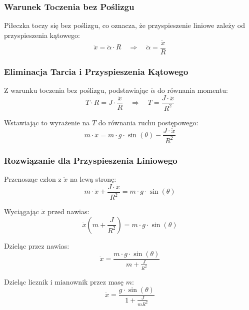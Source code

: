 \subsubsection{Warunek Toczenia bez Poślizgu}

Piłeczka toczy się bez poślizgu, co oznacza, że przyspieszenie liniowe zależy od 
przyspieszenia kątowego:
\begin{equation}
\ddot{x} = \ddot{\alpha} \cdot R \quad \Rightarrow \quad \ddot{\alpha} = \frac{\ddot{x}}{R}
\end{equation}

\subsubsection{Eliminacja Tarcia i Przyspieszenia Kątowego}

Z warunku toczenia bez poślizgu, podstawiając $\ddot{\alpha}$ do równania momentu:
\begin{equation}
T \cdot R = J \cdot \frac{\ddot{x}}{R} \quad \Rightarrow \quad T = \frac{J \cdot \ddot{x}}{R^2}
\end{equation}

Wstawiając to wyrażenie na $T$ do równania ruchu postępowego:
\begin{equation}
m \cdot \ddot{x} = m \cdot g \cdot \sin(\theta) - \frac{J \cdot \ddot{x}}{R^2}
\end{equation}

\subsubsection{Rozwiązanie dla Przyspieszenia Liniowego}

Przenosząc człon z $\ddot{x}$ na lewą stronę:
\begin{equation}
m \cdot \ddot{x} + \frac{J \cdot \ddot{x}}{R^2} = m \cdot g \cdot \sin(\theta)
\end{equation}

Wyciągając $\ddot{x}$ przed nawias:
\begin{equation}
\ddot{x} \left( m + \frac{J}{R^2} \right) = m \cdot g \cdot \sin(\theta)
\end{equation}

Dzieląc przez nawias:
\begin{equation}
\ddot{x} = \frac{m \cdot g \cdot \sin(\theta)}{m + \frac{J}{R^2}}
\end{equation}

Dzieląc licznik i mianownik przez masę $m$:
\begin{equation}
\ddot{x} = \frac{g \cdot \sin(\theta)}{1 + \frac{J}{m R^2}}
\end{equation}

